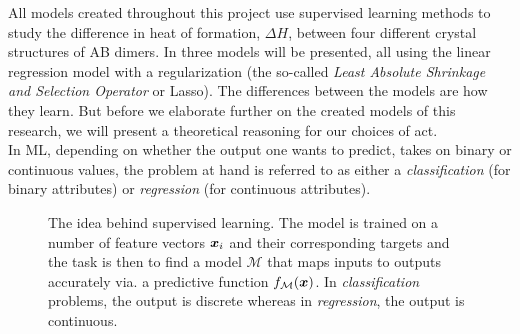 All models created throughout this project use supervised learning methods to study the difference in heat of formation, $\Delta H$, between four different crystal structures of AB dimers. In  three models will be presented, all using the linear regression model with a  regularization (the so-called \emph{Least Absolute Shrinkage and Selection Operator} or Lasso). The differences between the models are how they learn. But before we elaborate further on the created models of this research, we will present a theoretical reasoning for our choices of act.\\

In ML, depending on whether the output one wants to predict, takes on binary or continuous values, the problem at hand is referred to as either a \emph{classification} (for binary attributes) or \emph{regression} (for continuous attributes).

\begin{figure}[t]
\centering
    \iffigure
    \fi
    \caption[The Method of Supervised learning]{The idea behind supervised learning. The model is trained on a number of feature vectors $\bm{x}_i$ and their corresponding targets and the task is then to find a model $\mathcal{M}$ that maps inputs to outputs accurately via. a predictive function $f_{\mathcal{M}}\qty(\bm{x})$. In \emph{classification} problems, the output is discrete whereas in \emph{regression}, the output is continuous.}
    \label{fig:supervised_learning}
\end{figure}


